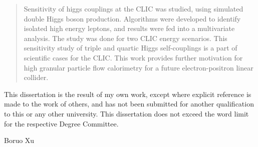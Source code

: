 \begin{abstract}
Sensitivity of higgs couplings at the CLIC was studied, using simulated double Higgs boson production. Algorithms were developed to identify isolated high energy leptons, and results were fed into a multivariate analysis. The study was done for two CLIC energy scenarios. This sensitivity study of triple and quartic Higgs self-couplings is a part of scientific cases for the CLIC. This work provides further motivation for high granular particle flow calorimetry for a future electron-positron linear collider.
\end{abstract}


\begin{declaration}
  This dissertation is the result of my own work, except where explicit
  reference is made to the work of others, and has not been submitted
  for another qualification to this or any other university. This
  dissertation does not exceed the word limit for the respective Degree
  Committee.
  \vspace*{1cm}
  \begin{flushright}
    Boruo Xu
  \end{flushright}
\end{declaration}


